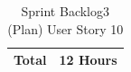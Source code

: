 \documentclass[12pt]{report}
\begin{document}
\begin{table}[h]
{\begin{tabular}{|cc|cccccc|}
\multicolumn{2}{|c|}{\textbf{Total}}                                                                                                                                                   & \multicolumn{6}{c|}{12   Hours}                                                                                                                                                                                                                                                                                                                                                                                                                                                                                                                                                                                                                                                        \\ \hline
\end{tabular}
}
\caption{Sprint Backlog3 (Plan) User Story 10}
\label{tab:mytable}
\end{table}
\end{document}
